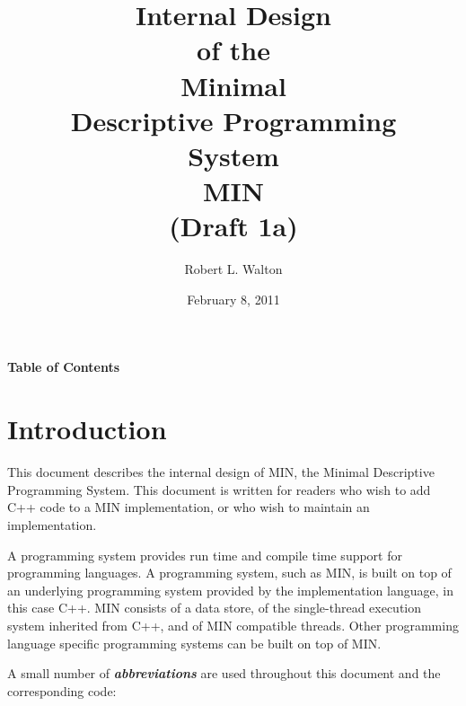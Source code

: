 \documentclass[12pt]{article}
\makeatletter
\renewcommand\tableofcontents{%
    \begin{list}{}%
	     {\setlength{\itemsep}{0in}%
	      \setlength{\topsep}{0in}%
	      \setlength{\parsep}{1ex}%
	      \setlength{\labelwidth}{0in}%
	      \setlength{\baselineskip}{1.5ex}%
	      \setlength{\leftmargin}{0.8in}%
	      \setlength{\rightmargin}{0.8in}}%
    \item\@starttoc{toc}%
    \end{list}}
\newcommand{\skey}[2]{{\bf \em #1#2}\index{#1}}
\makeatother
\begin{document}
        
\title{Internal Design\\[2ex]of the\\[2ex]
       Minimal\\Descriptive Programming\\System\\[2ex]MIN\\[2ex]
       (Draft 1a)}

\author{Robert L. Walton}

\date{February 8, 2011}
 
\maketitle

\newpage
\begin{center}
\large \bf Table of Contents
\end{center}

\bigskip

\tableofcontents 

\newpage

\section{Introduction}

This document describes the internal design of MIN,
the Minimal Descriptive Programming System.
This document is written for readers who wish to add C++ code
to a MIN implementation, or who wish to maintain an implementation.

A programming system provides run time and compile time support
for programming languages.
A programming system, such as MIN, is
built on top of an underlying programming system provided by the
implementation language, in this case C++.
MIN consists of a data store, of the single-thread execution system
inherited from C++, and of MIN compatible threads.
Other programming language specific
programming systems can be built on top of MIN.

A small number of \skey{abbreviation}s are used throughout this document
and the corresponding code:
\end{document}
